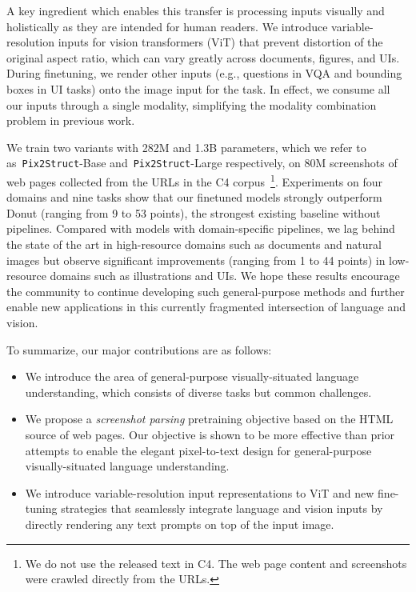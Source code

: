 \documentclass{article} %
\newcommand\ourmodel{{\texttt{Pix2Struct}}}
\begin{document}
A key ingredient which enables this transfer is processing inputs visually and holistically as they are intended for human readers. We introduce variable-resolution inputs for vision transformers (ViT) that prevent distortion of the original aspect ratio, which can vary greatly across documents, figures, and UIs. During finetuning, we render other inputs (e.g., questions in VQA and bounding boxes in UI tasks) onto the image input for the task. In effect, we consume all our inputs through a single modality, simplifying the modality combination problem in previous work.

We train two variants with 282M and 1.3B parameters, which we refer to as~\ourmodel-Base and~\ourmodel-Large respectively, on 80M screenshots of web pages collected from the URLs in the C4 corpus~\citep{t5}\footnote{We do not use the released text in C4. The web page content and screenshots were crawled directly from the URLs.}. Experiments on four domains and nine tasks show that our finetuned models strongly outperform Donut (ranging from 9 to 53 points), the strongest existing baseline without pipelines. Compared with models with domain-specific pipelines, we lag behind the state of the art in high-resource domains such as documents and natural images but observe significant improvements (ranging from 1 to 44 points) in low-resource domains such as illustrations and UIs. We hope these results encourage the community to continue developing such general-purpose methods and further enable new applications in this currently fragmented intersection of language and vision. 

To summarize, our major contributions are as follows:
\begin{itemize}[leftmargin=20pt,topsep=0pt,itemsep=0pt]
    \item We introduce the area of general-purpose visually-situated language understanding, which consists of diverse tasks but common challenges.
    \item We propose a \emph{screenshot parsing} pretraining objective based on the HTML source of web pages. Our objective is shown to be more effective than prior attempts to enable the elegant pixel-to-text design for general-purpose visually-situated language understanding.
    \item We introduce variable-resolution input representations to ViT and new fine-tuning strategies that seamlessly integrate language and vision inputs by directly rendering any text prompts on top of the input image.
\end{itemize}
\end{document}
